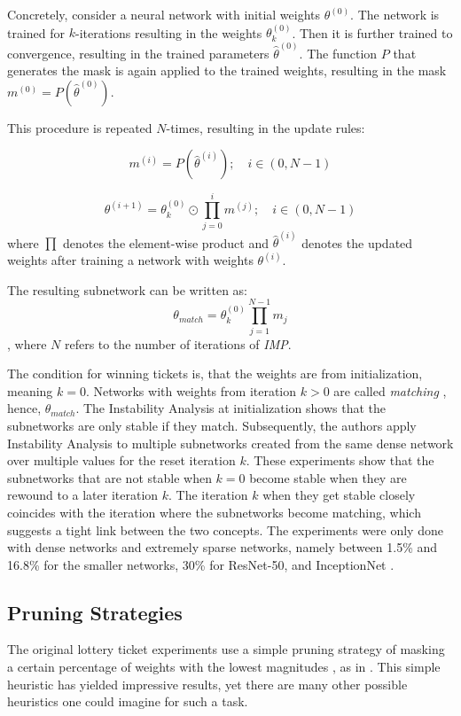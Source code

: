 Concretely, consider a neural network with initial weights $\theta^{(0)}$. The network is trained for $k$-iterations resulting in the weights $\theta_k^{(0)}$. Then it is further trained to convergence, resulting in the trained parameters $\hat \theta^{(0)}$.
The function $P$ that generates the mask is again applied to the trained weights, resulting in the mask $m^{(0)} = \textit{P}(\hat \theta^{(0)})$.

This procedure is repeated $N$-times, resulting in the update rules:

\[
m^{(i)} = \textit{P}(\hat \theta^{(i)}); \quad i \in (0,N-1)
\]

\[\theta^{(i+1)} = \theta_k^{(0)} \odot \prod_{j=0}^{i}m^{(j)}; \quad i \in (0,N-1)\] where $\prod$ denotes the element-wise product and $\hat \theta^{(i)}$ denotes the updated weights after training a network with weights $\theta^{(i)}$.

The resulting subnetwork can be written as:
\[
\theta_{match} = \theta_{k}^{(0)}\prod_{j=1}^{N-1}m_j
\]
, where $N$ refers to the number of iterations of \textit{IMP}.

The condition for winning tickets is, that the weights are from initialization, meaning $k=0$. 
Networks with weights from iteration $k > 0$ are called \textit{matching} \autocite{LinearModeConnectivity}, hence, $\theta_{match}$.
The Instability Analysis at initialization shows that the subnetworks are only stable if they match.
Subsequently, the authors apply Instability Analysis to multiple subnetworks created from the same dense network over multiple values for the reset iteration $k$.
These experiments show that the subnetworks that are not stable when $k=0$ become stable when they are rewound to a later iteration $k$.
The iteration $k$ when they get stable closely coincides with the iteration where the subnetworks become matching, which suggests a tight link between the two concepts.
The experiments were only done with dense networks and extremely sparse networks, namely between 1.5\% and 16.8\% for the smaller networks, 30\% for ResNet-50, and InceptionNet \autocite{LinearModeConnectivity}.

\subsection{Pruning Strategies}
The original lottery ticket experiments use a simple pruning strategy of masking a certain percentage of weights with the lowest magnitudes \autocite{LTH}, as in \autocite{HanEtAl15}. This simple heuristic has yielded impressive results, yet there are many other possible heuristics one could imagine for such a task.

